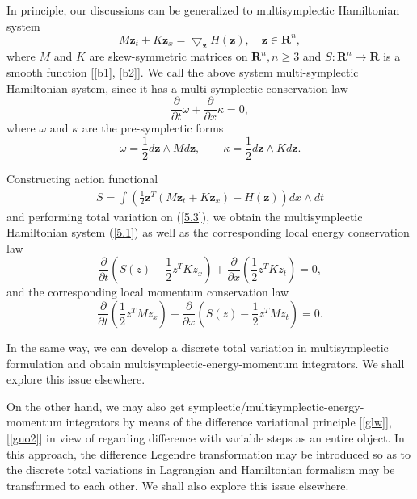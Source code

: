 \documentclass[a4paper,a4paper]{article}
\def\z{\boldsymbol{z}}
\begin{document}
In principle, our discussions can be generalized to multisymplectic Hamiltonian
system
\begin{equation}
   M\z_{t}+K\z_{x}=\bigtriangledown_{\z}H(\z),\quad \z\in \mathbf{R}^{n}, \label{5.1}
\end{equation}
where $M$ and $K$ are skew-symmetric matrices on $\mathbf{R}^{n},n\geq 3$ and $
S : \mathbf{R}^{n}\to \mathbf{R}$ is a smooth function [\ref{b1}, \ref{b2}]. We call the above system
  multi-symplectic Hamiltonian system, since it has a multi-symplectic conservation
law
\begin{equation}
    \frac{\partial}{\partial t}\omega +\frac{\partial}{\partial x}\kappa=0,\label{5.2}
\end{equation}
where $\omega $ and $\kappa$ are the pre-symplectic forms
\[
    \omega =\frac{1}{2}d\z\wedge Md\z, \quad  \quad
     \kappa =\frac{1}{2}d\z\wedge Kd\z.
\]

Constructing action functional
\begin{align}
 S=\int\left(\frac{1}{2}\z^{T}(M\z_{t}+K\z_{x})-H(\z)\right)dx\wedge dt \label{5.3}
\end{align}
and performing total variation on (\ref{5.3}), we obtain the
multisymplectic Hamiltonian system (\ref{5.1}) as well as the
corresponding local energy conservation law
\begin{equation}
    \frac{\partial}{\partial t}\left(S(z)-\frac{1}{2}z^{T}Kz_{x}\right)
  +\frac{\partial}{\partial x}\left(\frac{1}{2}z^{T}Kz_{t}\right)=0,
\end{equation}
and the corresponding local momentum conservation law
\begin{equation}
    \frac{\partial}{\partial t}\left(\frac{1}{2}z^{T}Mz_{x}\right)
   +\frac{\partial}{\partial x}\left(S(z)-\frac{1}{2}z^{T}Mz_{t}\right)=0.
\end{equation}

In the same way, we can develop a discrete total variation in
multisymplectic formulation and obtain
multisymplectic-energy-momentum integrators. We shall explore this
issue elsewhere.

On the other hand, we may also get
symplectic/multisymplectic-energy-momentum integrators by means of
the difference variational principle [\ref{glw}], [\ref{guo2}] in
view of regarding difference with variable steps as an entire
object. In this approach, the difference Legendre transformation
may be introduced so as to the discrete total variations in
Lagrangian and Hamiltonian formalism may be transformed to each
other. We shall also explore this issue elsewhere.
\end{document}
